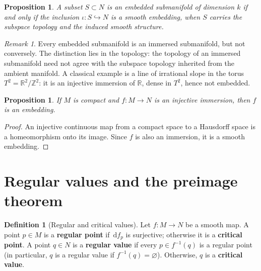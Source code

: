 \documentclass[12pt,a4paper,openany]{book}
\newtheorem{proposition}[theorem]{Proposition}
\theoremstyle{definition}
\newtheorem{definition}[theorem]{Definition}
\theoremstyle{remark}
\newtheorem{remark}[theorem]{Remark}
\newcommand{\Z}{\mathbb{Z}}
\newcommand{\R}{\mathbb{R}}
\newcommand{\dd}{\,\mathrm{d}}
\begin{document}
\begin{proposition}\label{prop:embedded-iff-embedding}%
A subset $S \subset N$ is an embedded submanifold of dimension $k$ if and
only if the inclusion $\iota \colon S \hookrightarrow N$ is a smooth
embedding, when $S$ carries the subspace topology and the induced smooth
structure.
\end{proposition}

\begin{remark}\label{rem:immersed-vs-embedded}
Every embedded submanifold is an immersed submanifold, but not conversely.
The distinction lies in the topology: the topology of an immersed
submanifold need not agree with the subspace topology inherited from the
ambient manifold.  A classical example is a line of irrational slope in
the torus $T^2 = \R^2/\Z^2$: it is an injective immersion of $\R$, dense
in $T^2$, hence not embedded.
\end{remark}

\begin{proposition}\label{prop:compact-immersion-embedding}%
If $M$ is compact and $f \colon M \to N$ is an injective immersion,
then $f$ is an embedding.
\end{proposition}

\begin{proof}
An injective continuous map from a compact space to a Hausdorff space is
a homeomorphism onto its image.  Since $f$ is also an immersion, it is
a smooth embedding.
\end{proof}

\section{Regular values and the preimage theorem}%
\label{sec:regular-value}

\begin{definition}[Regular and critical values]\label{def:regular-critical}%
Let $f \colon M \to N$ be a smooth map.  A point $p \in M$ is a
\textbf{regular point} if $\dd f_p$ is surjective;
otherwise it is a \textbf{critical point}.  A point $q \in N$ is a
\textbf{regular value} if every $p \in f^{-1}(q)$ is a regular point
(in particular, $q$ is a regular value if $f^{-1}(q) = \varnothing$).
Otherwise, $q$ is a \textbf{critical value}.
\end{definition}
\end{document}
